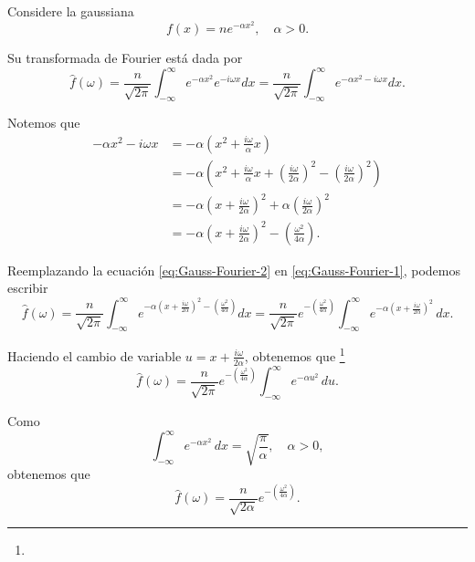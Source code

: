 \begin{ejemplo}

Considere la gaussiana
\begin{equation}
f(x) = n e^{-\alpha x^2}, \quad  \alpha > 0.    
\end{equation}

Su transformada de Fourier está dada por 
\begin{equation}
    \hat{f}(\omega) =  \frac{n}{\sqrt{2\pi}} \int_{-\infty}^{\infty} e^{-\alpha x^2} e^{-i\omega x} dx =  \frac{n}{\sqrt{2\pi}} \int_{-\infty}^{\infty} e^{-\alpha x^2-i\omega x} dx . \label{eq:Gauss-Fourier-1}
\end{equation}

Notemos que 
\begin{align}
    -\alpha x^2-i\omega x &= - \alpha \left( x^2 + \frac{i\omega}{\alpha}x \right) \nonumber\\
    &= - \alpha \left( x^2 + \frac{i\omega}{\alpha} x + \left( \frac{i\omega}{2\alpha} \right)^2 - \left( \frac{i\omega}{2\alpha} \right)^2 \right) \nonumber \\
    &= - \alpha \left( x + \frac{i\omega}{2\alpha} \right)^2 + \alpha \left( \frac{i\omega}{2\alpha} \right)^2 \nonumber \\
    &= - \alpha \left( x + \frac{i\omega}{2\alpha} \right)^2 - \left( \frac{\omega^2}{4\alpha} \right).  \label{eq:Gauss-Fourier-2}
\end{align}

Reemplazando la ecuación \eqref{eq:Gauss-Fourier-2} en \eqref{eq:Gauss-Fourier-1}, podemos escribir
\begin{equation}
    \hat{f}(\omega) =  \frac{n}{\sqrt{2\pi}} \int_{-\infty}^{\infty} e^{-\alpha \left( x + \frac{i\omega}{2\alpha} \right)^2 - \left( \frac{\omega^2}{4\alpha} \right)}  dx = \frac{n}{\sqrt{2\pi}} e^{- \left( \frac{\omega^2}{4\alpha} \right)} \int_{-\infty}^{\infty} e^{-\alpha \left( x + \frac{i\omega}{2\alpha} \right)^2} \,dx. 
\end{equation}

Haciendo el cambio de variable $u = x + \frac{i\omega}{2\alpha}$, obtenemos que \footnote{}
\begin{equation}
    \hat{f}(\omega) = \frac{n}{\sqrt{2\pi}} e^{- \left( \frac{\omega^2}{4\alpha} \right)} \int_{-\infty}^{\infty} e^{-\alpha u^2} \,du.
\end{equation}

Como
\begin{equation}
\int_{-\infty}^{\infty} e^{-\alpha x^2} \,dx = \sqrt{\frac{\pi}{\alpha}}, \quad \alpha > 0,    
\end{equation} 
obtenemos que 
\begin{equation}
\hat{f}(\omega) = \frac{n}{\sqrt{2\alpha}} e^{- \left( \frac{\omega^2}{4\alpha} \right)}.  \label{eq:Fourier-Gaussiana}  
\end{equation}
\vfill
    \footnoterule
    

\end{ejemplo}

